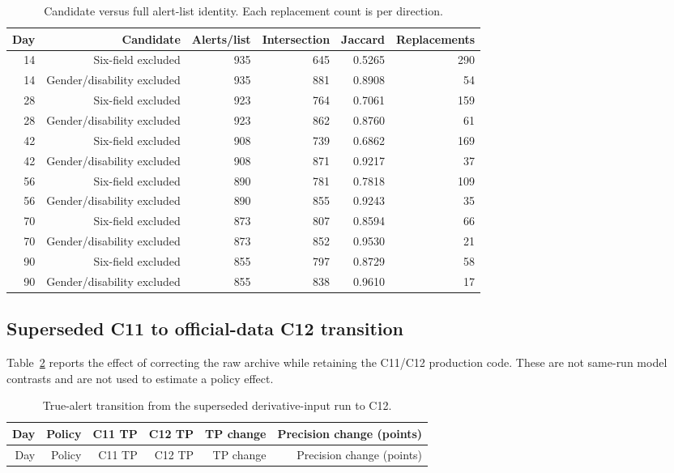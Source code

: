 \begin{table}[htbp]
\centering
\caption{Candidate versus full alert-list identity. Each replacement count is per direction.}
\label{tab:s_overlap}
\scriptsize
\begin{tabular}{rrrrrr}
\toprule
Day & Candidate & Alerts/list & Intersection & Jaccard & Replacements \\
\midrule
14 & Six-field excluded & 935 & 645 & 0.5265 & 290 \\
14 & Gender/disability excluded & 935 & 881 & 0.8908 & 54 \\
28 & Six-field excluded & 923 & 764 & 0.7061 & 159 \\
28 & Gender/disability excluded & 923 & 862 & 0.8760 & 61 \\
42 & Six-field excluded & 908 & 739 & 0.6862 & 169 \\
42 & Gender/disability excluded & 908 & 871 & 0.9217 & 37 \\
56 & Six-field excluded & 890 & 781 & 0.7818 & 109 \\
56 & Gender/disability excluded & 890 & 855 & 0.9243 & 35 \\
70 & Six-field excluded & 873 & 807 & 0.8594 & 66 \\
70 & Gender/disability excluded & 873 & 852 & 0.9530 & 21 \\
90 & Six-field excluded & 855 & 797 & 0.8729 & 58 \\
90 & Gender/disability excluded & 855 & 838 & 0.9610 & 17 \\
\bottomrule
\end{tabular}
\end{table}
\FloatBarrier

\subsection{Superseded C11 to official-data C12 transition}

Table~\ref{tab:s_transition} reports the effect of correcting the raw archive while retaining the C11/C12 production code. These are not same-run model contrasts and are not used to estimate a policy effect.

\small
\begin{longtable}{rrr r r r}
\caption{True-alert transition from the superseded derivative-input run to C12.}\label{tab:s_transition}\\
\toprule
Day & Policy & C11 TP & C12 TP & TP change & Precision change (points) \\
\midrule
\endfirsthead
\toprule
Day & Policy & C11 TP & C12 TP & TP change & Precision change (points) \\
\midrule
\endhead

\end{longtable}
\normalsize

